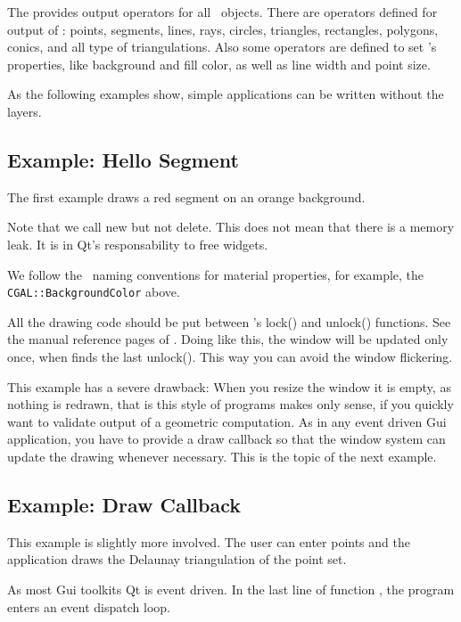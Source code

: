 The  provides output operators for all \cgal\
objects. There are operators defined for output of : points, segments, 
lines, rays, circles, triangles, rectangles, polygons, conics,  and all type of
triangulations. Also some operators are defined to set
's properties, like background and fill color, as
well as line width and point size.

As the following examples show, simple applications can be written
without the layers.

\subsection{Example: Hello Segment}
The first example draws a red segment on an orange background.

Note that we call new but not delete. This does not mean that there is 
a memory leak. It is in Qt's responsability to free widgets.

We follow the \qt\ naming conventions for material properties, for
example, the {\tt CGAL::BackgroundColor} above.

All the drawing code should be put between 's lock() and
unlock() functions. See the manual reference pages of
. Doing like this, the window will be updated only
once, when \ccStyle{Qt\_widget} finds the last unlock(). This way you
can avoid the window flickering.

This example has a severe drawback: When you resize the window it is
empty, as nothing is redrawn, that is this style of programs makes
only sense, if you quickly want to validate output of a geometric
computation. As in any event driven {\sc Gui} application, you have to provide 
a draw callback so that the window system can update the drawing
whenever necessary. This is the topic of the next example.

\subsection{Example: Draw Callback}

This example is slightly more involved. The user can enter points and
the application draws the Delaunay triangulation of the point set. 


As most {\sc Gui} toolkits Qt is event driven.  In the last line
of function \ccc{main}, the program enters an event dispatch loop.

